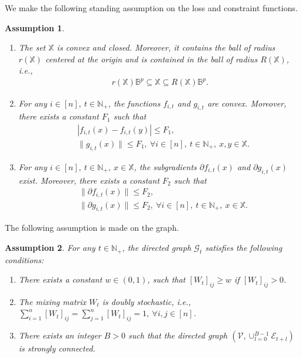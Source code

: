 \documentclass[12pt,draftcls,onecolumn]{IEEEtran}%
\newtheorem{assumption}{Assumption}
\begin{document}
We make the following standing assumption on the loss and constraint functions.
\begin{assumption}\label{online_op:assfunction}
	\begin{enumerate}
		\item The set $\mathbb{X}$ is convex and closed. Moreover, it contains the ball of radius $r(\mathbb{X})$ centered at the origin and is contained in the ball of radius $R(\mathbb{X})$, i.e.,
		\begin{align}
			r(\mathbb{X})\mathbb{B}^p\subseteq\mathbb{X}\subseteq R(\mathbb{X})\mathbb{B}^p.\label{online_op:domainupper}
		\end{align}
		\item For any $i\in[n],~t\in\mathbb{N}_+$, the functions $f_{i,t}$ and $g_{i,t}$ are convex.  Moreover, there exists a constant $F_1$ such that
		\begin{subequations}\label{online_op:ftgtupper}
			\begin{align}
				&|f_{i,t}(x)-f_{i,t}(y)|\le F_1,\label{online_op:ftgtupper-a}\\
				&\|g_{i,t}(x)\|\le F_1,~\forall i\in[n],~t\in\mathbb{N}_+,~ x,y\in\mathbb{X}.\label{online_op:ftgtupper-b}
			\end{align}
		\end{subequations}
		\item For any $i\in[n],~t\in\mathbb{N}_+,~x\in\mathbb{X}$, the subgradients $\partial f_{i,t}(x)$ and $\partial g_{i,t}(x)$ exist. Moreover, there exists a constant $F_2$ such that
		\begin{subequations}\label{online_op:subgupper}
			\begin{align}
				&\|\partial f_{i,t}(x)\|\le F_2,\label{online_op:subgupper-a}\\
				& \|\partial g_{i,t}(x)\|\le F_2,~\forall i\in[n],~t\in\mathbb{N}_+,~ x\in\mathbb{X}.\label{online_op:subgupper-b}
			\end{align}
		\end{subequations}
	\end{enumerate}
\end{assumption}

The following assumption is made on the graph.
\begin{assumption}\label{online_op:assgraph}
	For any $t\in\mathbb{N}_+$, the directed graph $\mathcal{G}_t$ satisfies the following conditions:
	\begin{enumerate}[label=(\alph*)]
		\item There exists a constant $w\in(0,1)$, such that $[W_t]_{ij}\ge w$ if $[W_t]_{ij}>0$.
		\item The mixing matrix $W_t$ is doubly stochastic, i.e., $\sum_{i=1}^n[W_t]_{ij}=\sum_{j=1}^n[W_t]_{ij}=1,~\forall i,j\in[n]$.
		\item There exists an integer $B>0$ such that the directed graph $(\mathcal{V},\cup_{l=0}^{ B -1}\mathcal{E}_{t+l})$ is strongly connected.
	\end{enumerate}
\end{assumption}
\end{document}
